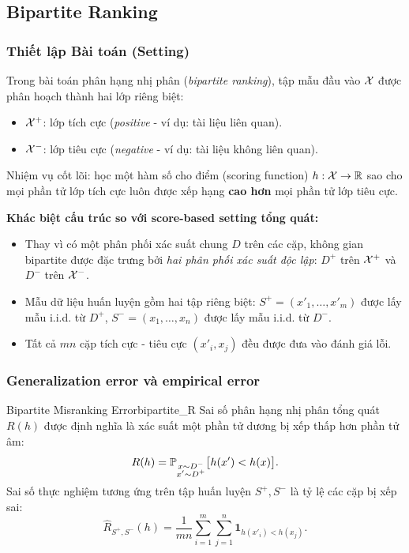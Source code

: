 \subsection{Bipartite Ranking}
\label{sec:bipartite}

\subsubsection{Thiết lập Bài toán (Setting)}

Trong bài toán phân hạng nhị phân (\textit{bipartite ranking}), tập mẫu đầu vào $\mathcal{X}$ được phân hoạch thành hai lớp riêng biệt:
\begin{itemize}
    \item $\mathcal{X}^+$: lớp tích cực (\textit{positive} - ví dụ: tài liệu liên quan).
    \item $\mathcal{X}^-$: lớp tiêu cực (\textit{negative} - ví dụ: tài liệu không liên quan).
\end{itemize}
Nhiệm vụ cốt lõi: học một hàm số cho điểm (scoring function) $h: \mathcal{X} \to \mathbb{R}$ sao cho mọi phần tử lớp tích cực luôn được xếp hạng \textbf{cao hơn} mọi phần tử lớp tiêu cực.

\textbf{Khác biệt cấu trúc so với score-based setting tổng quát:}
\begin{itemize}
    \item Thay vì có một phân phối xác suất chung $D$ trên các cặp, không gian bipartite được đặc trưng bởi \textit{hai phân phối xác suất độc lập}: $D^+$ trên $\mathcal{X}^+$ và $D^-$ trên $\mathcal{X}^-$.
    \item Mẫu dữ liệu huấn luyện gồm hai tập riêng biệt:
          $S^+ = (x'_1, \ldots, x'_m)$ được lấy mẫu i.i.d. từ $D^+$,
          $S^- = (x_1, \ldots, x_n)$ được lấy mẫu i.i.d. từ $D^-$.
    \item Tất cả $mn$ cặp tích cực - tiêu cực $(x'_i, x_j)$ đều được đưa vào đánh giá lỗi.
\end{itemize}

\subsubsection{Generalization error và empirical error}

\begin{definition}{Bipartite Misranking Error}{bipartite_R}
Sai số phân hạng nhị phân tổng quát $R(h)$ được định nghĩa là xác suất một phần tử dương bị xếp thấp hơn phần tử âm:
\begin{equation}
    R(h) = \mathbb{P}_{\substack{x \sim D^- \\ x' \sim D^+}}\bigl[h(x') < h(x)\bigr].
    \label{eq:R_bipartite}
\end{equation}
Sai số thực nghiệm tương ứng trên tập huấn luyện $S^+, S^-$ là tỷ lệ các cặp bị xếp sai:
\begin{equation}
    \hat{R}_{S^+, S^-}(h) = \frac{1}{mn} \sum_{i=1}^m \sum_{j=1}^n \mathbf{1}_{h(x'_i) < h(x_j)}.
    \label{eq:R_emp_bipartite}
\end{equation}
\end{definition}

